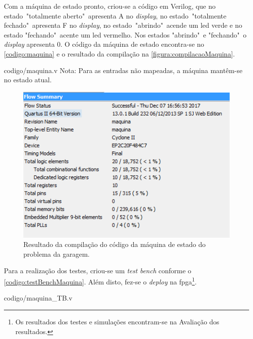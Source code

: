 		Com a máquina de estado pronto, criou-se a código em Verilog, que no
		estado\ "totalmente aberto"\ apresenta A no \textit{display}, no estado\ "totalmente fechado"\
		apresenta F no \textit{display}, no estado\ "abrindo"\ acende um \ac{led} verde e no
		estado "fechando"\ acente um \ac{led} vermelho. Nos estados "abrindo"\ e "fechando"\ o
		\textit{display} apresenta 0. O código da máquina de estado encontra-se no \autoref{codigo:maquina} e o resultado da
		compilação na \autoref{figura:compilacaoMaquina}.

		
		{codigo/maquina.v}
		Nota: Para as entradas não mapeadas, a máquina mantêm-se no estado atual.

		\begin{figure}[H]
			 \centering
			 \caption{\label{figura:compilacaoMaquina}Resultado da compilação do código da máquina de
			  estado do problema da garagem.}
			 \includegraphics[width=1\textwidth]{img/maquina/compilacao}
		\end{figure}

		Para a realização dos testes, criou-se um \textit{test bench} conforme o \autoref{codigo:testBenchMaquina}.
		Além disto, fez-se o \textit{deploy} na \ac{fpga}\footnote{Os resultados dos
		 testes e simulações encontram-se na Avaliação dos resultados.}.

		
		{codigo/maquina_TB.v}





